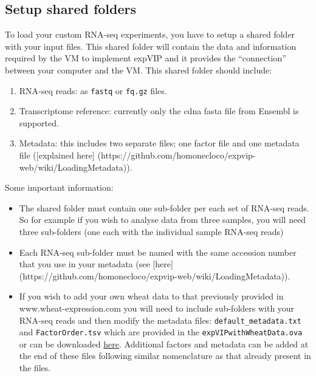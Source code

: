 \subsection{Setup shared folders}\label{setup-shared-folders}

To load your custom RNA-seq experiments, you have to setup a shared
folder with your input files. This shared folder will contain the data
and information required by the VM to implement expVIP and it provides
the ``connection'' between your computer and the VM. This shared folder
should include:

\begin{enumerate}
\def\labelenumi{\arabic{enumi}.}
\itemsep1pt\parskip0pt
\item
  RNA-seq reads: as \lstinline!fastq! or \lstinline!fq.gz! files.
\item
  Transcriptome reference: currently only the cdna fasta file from
  Ensembl is supported.
\item
  Metadata: this includes two separate files; one factor file and one
  metadata file ({[}explained here{]}
  (https://github.com/homonecloco/expvip-web/wiki/LoadingMetadata)).
\end{enumerate}

Some important information:

\begin{itemize}
\itemsep1pt\parskip0pt
\item
  The shared folder must contain one sub-folder per each set of RNA-seq
  reads. So for example if you wish to analyse data from three samples,
  you will need three sub-folders (one each with the individual sample
  RNA-seq reads)
\item
  Each RNA-seq sub-folder must be named with the same accession number
  that you use in your metadata (see {[}here{]}
  (https://github.com/homonecloco/expvip-web/wiki/LoadingMetadata)).
\item
  If you wish to add your own wheat data to that previously provided in
  www.wheat-expression.com you will need to include sub-folders with
  your RNA-seq reads and then modify the metadata files:
  \lstinline!default_metadata.txt! and \lstinline!FactorOrder.tsv! which
  are provided in the \lstinline!expVIPwithWheatData.ova! or can be
  downloaded
  \href{https://www.dropbox.com/sh/n15tpsqj92wfn8u/AABivEEUj4sRd9tG830WnSi4a?dl=0}{here}.
  Additional factors and metadata can be added at the end of these files
  following similar nomenclature as that already present in the files.
\end{itemize}

